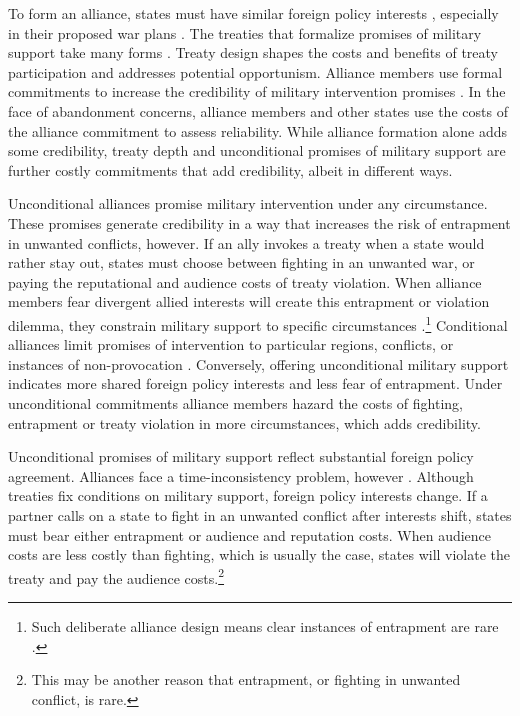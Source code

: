\documentclass[12pt]{article}
\begin{document}
To form an alliance, states must have similar foreign policy interests \citep{Morrow1991, Smith1995, FordhamPoast2014}, especially in their proposed war plans \citep{Poast2019a}. 
The treaties that formalize promises of military support take many forms \citep{Leedsetal2000, Leedsetal2002, Benson2012, BensonClinton2016}. 
Treaty design shapes the costs and benefits of treaty participation and addresses potential opportunism. 
Alliance members use formal commitments to increase the credibility of military intervention promises \citep{Morrow2000}. 
In the face of abandonment concerns, alliance members and other states use the costs of the alliance commitment to assess reliability. 
While alliance formation alone adds some credibility, treaty depth and unconditional promises of military support are further costly commitments that add credibility, albeit in different ways.  


Unconditional alliances promise military intervention under any circumstance. 
These promises generate credibility in a way that increases the risk of entrapment in unwanted conflicts, however. 
If an ally invokes a treaty when a state would rather stay out, states must choose between fighting in an unwanted war, or paying the reputational \citep{Gibler2008, Crescenzietal2012} and audience \citep{Fearon1997} costs of treaty violation.
When alliance members fear divergent allied interests will create this entrapment or violation dilemma, they constrain military support to specific circumstances \citep{Kim2011, Benson2012}.\footnote{Such deliberate alliance design means clear instances of entrapment are rare \citep{Kim2011, Beckley2015}.} 
Conditional alliances limit promises of intervention to particular regions, conflicts, or instances of non-provocation \citep{Leedsetal2000}. 
Conversely, offering unconditional military support indicates more shared foreign policy interests and less fear of entrapment.
Under unconditional commitments alliance members hazard the costs of fighting, entrapment or treaty violation in more circumstances, which adds credibility.  


Unconditional promises of military support reflect substantial foreign policy agreement.
Alliances face a time-inconsistency problem, however \citep{LeedsSavun2007}. 
Although treaties fix conditions on military support, foreign policy interests change. 
If a partner calls on a state to fight in an unwanted conflict after interests shift, states must bear either entrapment or audience and reputation costs.
When audience costs are less costly than fighting, which is usually the case, states will violate the treaty and pay the audience costs.\footnote{This may be another reason that entrapment, or fighting in unwanted conflict, is rare.}    
\end{document}
